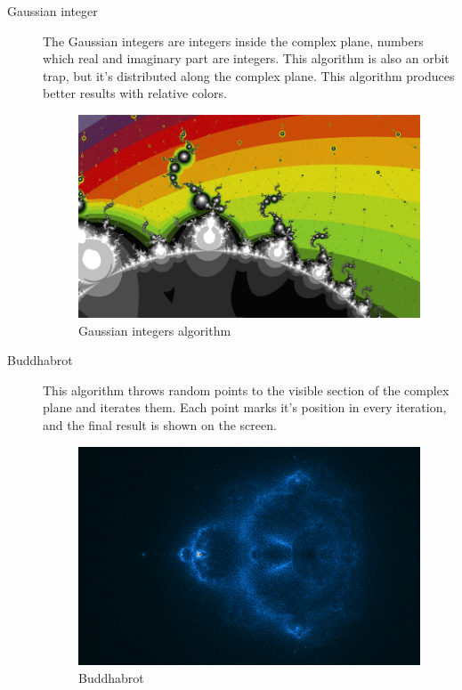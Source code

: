 \documentclass[oneside]{book}
\begin{document}
\begin{description}
\item[Gaussian integer] The Gaussian integers are integers inside the complex plane, numbers which real and imaginary part are integers. This algorithm is also an orbit trap, but it's distributed along the complex plane. This algorithm produces better results with relative colors.

\begin{figure}[h!]
	\centering
	\includegraphics[scale=0.3]{img/fractal4.png}
	\caption{Gaussian integers algorithm}
	\label{GaussianInt}
\end{figure}

\item[Buddhabrot] This algorithm throws random points to the visible section of the complex plane and iterates them. Each point marks it's position in every iteration, and the final result is shown on the screen.

\begin{figure}[h!]
	\centering
	\includegraphics[scale=0.4]{img/fractal6.png}
	\caption{Buddhabrot}
	\label{Buddhabrot}
\end{figure}


\end{description}
\end{document}
